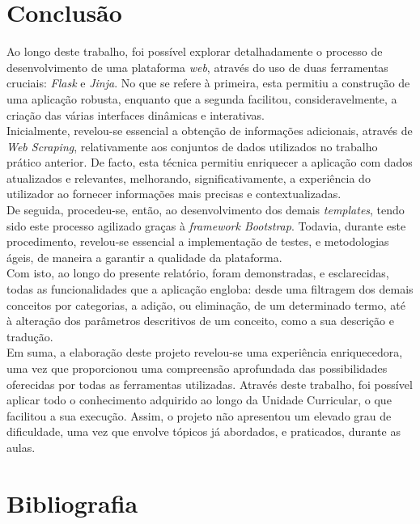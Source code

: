 \section{Conclusão}
Ao longo deste trabalho, foi possível explorar detalhadamente o processo de desenvolvimento de uma plataforma \textit{web}, através do uso de duas ferramentas cruciais: \textit{Flask} e \textit{Jinja}. No que se refere à primeira, esta permitiu a construção de uma aplicação robusta, enquanto que a segunda facilitou, consideravelmente, a criação das várias interfaces dinâmicas e interativas.\\

Inicialmente, revelou-se essencial a obtenção de informações adicionais, através de \textit{Web Scraping}, relativamente aos conjuntos de dados utilizados no trabalho prático anterior. De facto, esta técnica permitiu enriquecer a aplicação com dados atualizados e relevantes, melhorando, significativamente, a experiência do utilizador ao fornecer informações mais precisas e contextualizadas.\\

De seguida, procedeu-se, então, ao desenvolvimento dos demais \textit{templates}, tendo sido este processo agilizado graças à \textit{framework Bootstrap}. Todavia, durante este procedimento, revelou-se essencial a implementação de testes, e metodologias ágeis, de maneira a garantir a qualidade da plataforma. \\

Com isto, ao longo do presente relatório, foram demonstradas, e esclarecidas, todas as funcionalidades que a aplicação engloba: desde uma filtragem dos demais conceitos por categorias, a adição, ou eliminação, de um determinado termo, até à alteração dos parâmetros descritivos de um conceito, como a sua descrição e tradução.\\

Em suma, a elaboração deste projeto revelou-se uma experiência enriquecedora, uma vez que proporcionou uma compreensão aprofundada das possibilidades oferecidas por todas as ferramentas utilizadas. Através deste trabalho, foi possível aplicar todo o conhecimento adquirido ao longo da Unidade Curricular, o que facilitou a sua execução. Assim, o projeto não apresentou um elevado grau de dificuldade, uma vez que envolve tópicos já abordados, e praticados, durante as aulas.

\section{Bibliografia}
\printbibliography




